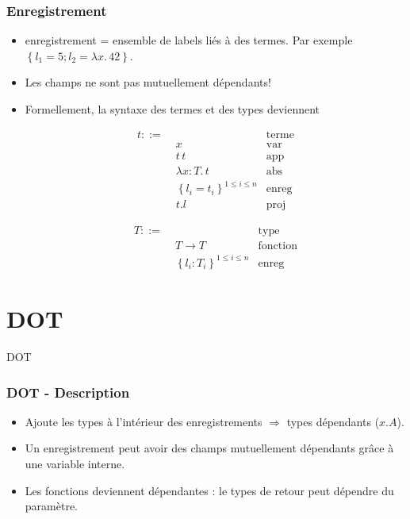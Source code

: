 \documentclass{beamer}
\newcommand{\lambdaExpr}[2]{\lambda #1 . \, #2}
\begin{document}
\begin{frame}
  \frametitle{Enregistrement}
  \begin{itemize}
  \item enregistrement = ensemble de labels liés à des termes. Par exemple
    $\left\{ l_{1} = 5 ; l_{2} = \lambdaExpr{x}42 \right\}$.
  \item Les champs ne sont pas mutuellement dépendants!
  \item Formellement, la syntaxe des termes et des types deviennent
    \begin{minipage}{0.45\textwidth}
      \begin{align*}
        t ::= & \, & \text{terme} \\
              & \; x & \text{var} \\
              & \; t \, t & \text{app} \\
              & \; \lambdaExpr{x : T}{t} & \text{abs} \\
              & \; \left\{ l_{i} = t_{i} \right\}^{1 \leq i \leq n} & \text{enreg} \\
              & \; t.l & \text{proj}
      \end{align*}
    \end{minipage}
    \begin{minipage}{0.45\textwidth}
      \begin{align*}
        T ::= & \, & \text{type} \\
              & \; T \rightarrow T & \text{fonction} \\
              & \; \left\{ l_{i} : T_{i} \right\}^{1 \leq i \leq n} & \text{enreg}
      \end{align*}
    \end{minipage}
  \end{itemize}
\end{frame}


\section{DOT}

\begin{frame}
	\begin{center}
		\Huge{DOT}
	\end{center}
\end{frame}

\begin{frame}
  \frametitle{DOT - Description}
  \begin{itemize}
  \item Ajoute les types à l'intérieur des enregistrements $\Rightarrow$ types
    dépendants ($x.A$).
  \item Un enregistrement peut avoir des champs mutuellement dépendants grâce à
    une variable interne.
  \item Les fonctions deviennent dépendantes : le types de retour peut dépendre
    du paramètre.
  \end{itemize}
\end{frame}
\end{document}
